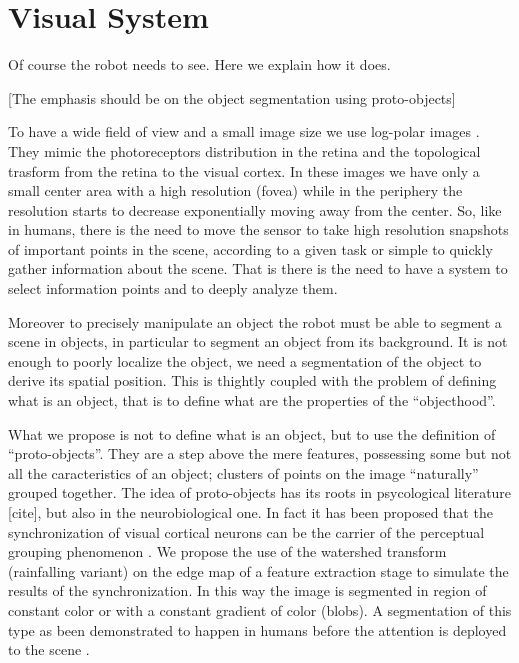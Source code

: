 \section{Visual System}
Of course the robot needs to see. Here we explain how it does.

[The emphasis should be on the object segmentation using proto-objects]

To have a wide field of view and a small image size we use log-polar images \cite{sandini80retinalike}. They mimic the photoreceptors distribution in the retina and the topological trasform from the retina to the visual cortex. In these images we have only a small center area with a high resolution (fovea) while in the periphery the resolution starts to decrease exponentially moving away from the center. So, like in humans, there is the need to move the sensor to take high resolution snapshots of important points in the scene, according to a given task or simple to quickly gather information about the scene. That is there is the need to have a system to select information points and to deeply analyze them.

Moreover to precisely manipulate an object the robot must be able to segment a scene in objects, in particular to segment an object from its background. It is not enough to poorly localize the object, we need a segmentation of the object to derive its spatial position. This is thightly coupled with the problem of defining what is an object, that is to define what are the properties of the ``objecthood''.

What we propose is not to define what is an object, but to use the definition of ``proto-objects''. They are a step above the mere features, possessing some but not all the caracteristics of an object; clusters of points on the image ``naturally'' grouped together. The idea of proto-objects has its roots in psycological literature [cite], but also in the neurobiological one. In fact it has been proposed that the synchronization of visual cortical neurons can be the carrier of the perceptual grouping phenomenon \cite{eckhorn88coherent,gray89oscillatory}. We propose the use of the watershed transform (rainfalling variant) \cite{smet00rainfalling} on the edge map of a feature extraction stage to simulate the results of the synchronization. In this way the image is segmented in region of constant color or with a constant gradient of color (blobs). A segmentation of this type as been demonstrated to happen in humans before the attention is deployed to the scene \cite{driver00segmentation}.

